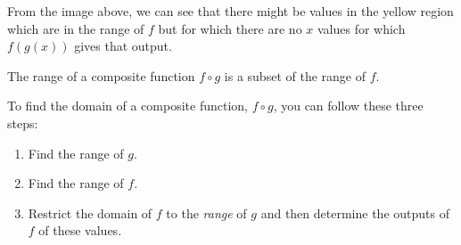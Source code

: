 \documentclass{ximera}
\begin{document}
From the image above, we can see that there might be values in the yellow region which are in the range of $f$ but for which there are no $x$ values for which $f(g(x))$ gives that output.

\begin{callout}
	The range of a composite function $f\circ g$ is a subset of the range of $f$. 
\end{callout}

To find the domain of a composite function, $f \circ g$, you can follow these three steps:
\begin{enumerate}[label=\arabic*)]
	\item Find the range of $g$.
	\item Find the range of $f$.
	\item Restrict the domain of $f$ to the \emph{range} of $g$ and then determine the outputs of $f$ of these values.  
\end{enumerate} 
\end{document}
